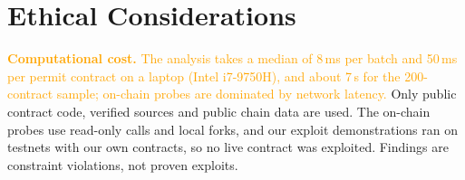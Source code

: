\documentclass[10pt,conference]{IEEEtran}
\newcommand{\AS}[1]{\textcolor{orange}{#1}}
\begin{document}
\section*{Ethical Considerations}
\AS{\textbf{Computational cost.} The analysis takes a median of 8\,ms per batch and 50\,ms per permit contract on a laptop (Intel i7-9750H), and about 7\,s for the 200-contract sample; on-chain probes are dominated by network latency.}
Only public contract code, verified sources and public chain data are used. The on-chain probes use read-only calls and local forks, and our exploit demonstrations ran on testnets with our own contracts, so no live contract was exploited. Findings are constraint violations, not proven exploits.


{\scriptsize}
\end{document}
